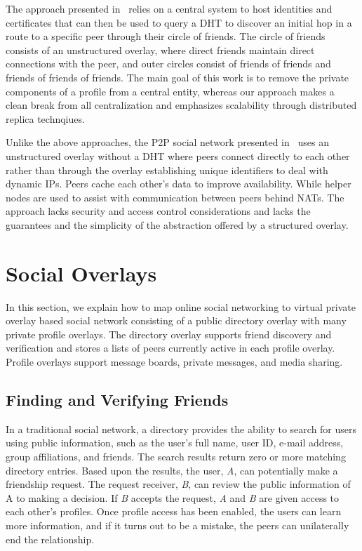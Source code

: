 \documentclass[conference]{IEEEtran}
\begin{document}
The approach presented in~\cite{matryoshka} relies on a central system to host
identities and certificates that can then be used to query a DHT to discover
an initial hop in a route to a specific peer through their circle of friends.
The circle of friends consists of an unstructured overlay, where direct
friends maintain direct connections with the peer, and outer circles consist
of friends of friends and friends of friends of friends.  The main goal of
this work is to remove the private components of a profile from a central
entity, whereas our approach makes a clean break from all centralization and
emphasizes scalability through distributed replica technqiues.

Unlike the above approaches, the P2P social network presented
in~\cite{tribler-osn} uses an unstructured overlay without a DHT where peers
connect directly to each other rather than through the overlay establishing
unique identifiers to deal with dynamic IPs.  Peers cache each other's data to
improve availability.  While helper nodes are used to assist with
communication between peers behind NATs.  The approach lacks security and
access control considerations and lacks the guarantees and the simplicity of
the abstraction offered by a structured overlay.

\section{Social Overlays}
\label{social_overlays}

In this section, we explain how to map online social networking to virtual
private overlay based social network consisting of a public directory overlay
with many private profile overlays.  The directory overlay supports friend
discovery and verification and stores a lists of peers currently active in
each profile overlay.  Profile overlays support message boards, private
messages, and media sharing.

\subsection{Finding and Verifying Friends}

In a traditional social network, a directory provides the ability to search
for users using public information, such as the user's full name, user ID,
e-mail address, group affiliations, and friends.  The search results return
zero or more matching directory entries.  Based upon the results, the user,
\textit{A}, can potentially make a friendship request.  The request receiver,
\textit{B}, can review the public information of A to making a decision.  If
\textit{B} accepts the request, \textit{A} and \textit{B} are given access to
each other's profiles.  Once profile access has been enabled, the users can
learn more information, and if it turns out to be a mistake, the peers can
unilaterally end the relationship.
\end{document}

